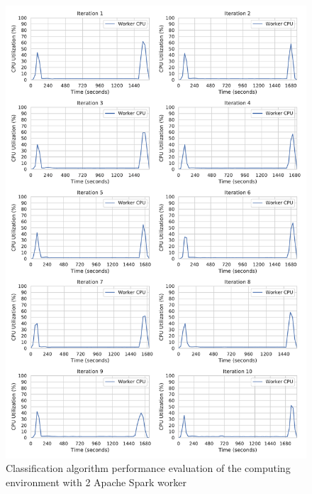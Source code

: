 \begin{figure}[h]
\centering
\includegraphics[scale=0.4]{images/07_evaluation/mortgage/mortgage_2_worker_cpu_performance}
\caption{Classification algorithm performance evaluation of the computing environment with 2 Apache Spark worker}
\label{fig:07_mortgage_static-cpu_results}
\end{figure}

